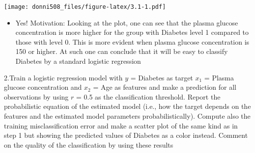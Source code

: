 \documentclass[
]{article}
\newenvironment{Shaded}{\begin{snugshade}}{\end{snugshade}}
\newcommand{\AttributeTok}[1]{\textcolor[rgb]{0.77,0.63,0.00}{#1}}
\newcommand{\DecValTok}[1]{\textcolor[rgb]{0.00,0.00,0.81}{#1}}
\newcommand{\FunctionTok}[1]{\textcolor[rgb]{0.00,0.00,0.00}{#1}}
\newcommand{\NormalTok}[1]{#1}
\newcommand{\OtherTok}[1]{\textcolor[rgb]{0.56,0.35,0.01}{#1}}
\newcommand{\SpecialCharTok}[1]{\textcolor[rgb]{0.00,0.00,0.00}{#1}}
\newcommand{\StringTok}[1]{\textcolor[rgb]{0.31,0.60,0.02}{#1}}
\providecommand{\tightlist}{%
  \setlength{\itemsep}{0pt}\setlength{\parskip}{0pt}}
\begin{document}
\begin{Shaded}
\end{Shaded}

\texttt{[image: donni508\_files/figure-latex/3.1-1.pdf]}

\begin{itemize}
\tightlist
\item
  Yes! Motivation: Looking at the plot, one can see that the plasma
  glucose concentration is more higher for the group with Diabetes level
  1 compared to those with level 0. This is more evident when plasma
  glucose concentration is 150 or higher. At such one can conclude that
  it will be easy to classify Diabetes by a standard logistic regression
\end{itemize}

2.Train a logistic regression model with \(y\) = Diabetes as target
\(x_1\) = Plasma glucose concentration and \(x_2\) = Age as features and
make a prediction for all observations by using \(r\) = 0.5 as the
classification threshold. Report the probabilistic equation of the
estimated model (i.e., how the target depends on the features and the
estimated model parameters probabilistically). Compute also the training
misclassification error and make a scatter plot of the same kind as in
step 1 but showing the predicted values of Diabetes as a color instead.
Comment on the quality of the classification by using these results
\end{document}
